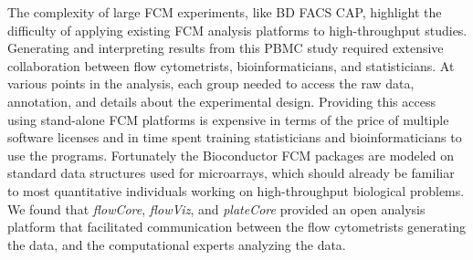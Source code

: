 \documentclass[12pt]{article}
\newcommand{\Rpackage}[1]{{\textit{#1}}}
\begin{document}
The complexity of large FCM experiments, like BD FACS CAP, highlight the 
difficulty of applying existing FCM analysis platforms to high-throughput
studies. Generating and interpreting results from this PBMC study required
extensive collaboration between flow cytometrists, bioinformaticians, and
statisticians. At various points in the analysis, each group needed to access
the raw data, annotation, and details about the experimental design. Providing
this access using stand-alone FCM platforms is expensive in terms of the price
of multiple software licenses and in time spent training statisticians and
bioinformaticians to use the programs. Fortunately the Bioconductor FCM
packages are modeled on standard data structures used for microarrays, which
should already be familiar to most quantitative individuals working on
high-throughput biological problems. We found that \Rpackage{flowCore},
\Rpackage{flowViz}, and \Rpackage{plateCore} provided an open analysis platform
that facilitated communication between the flow cytometrists generating the
data, and the computational experts analyzing the data.


\clearpage

 
\end{document}
